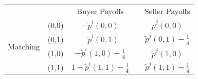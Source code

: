 \documentclass[12pt,letterpaper]{article}           %
\begin{document}
\newpage

\begin{table}[]
	\begin{tabular}{lcccc}
		&                            & Buyer Payoffs         &                       & Seller Payoffs        \\ \cline{3-3} \cline{5-5} 
		& \multicolumn{1}{c|}{(0,0)} & \multicolumn{1}{c|}{$ -\tilde{p}^i(0,0)$} & \multicolumn{1}{c|}{} & \multicolumn{1}{c|}{$ \tilde{p}^j(0,0)$} \\ \cline{3-3} \cline{5-5} 
		\multirow{2}{*}{Matching} & \multicolumn{1}{c|}{(0,1)} & \multicolumn{1}{c|}{$ -\tilde{p}^i(0,1)$} & \multicolumn{1}{c|}{} & \multicolumn{1}{c|}{$ \tilde{p}^j(0,1) -\frac{1}{4}$}  \\ \cline{3-3} \cline{5-5} 
		& \multicolumn{1}{c|}{(1,0)} & \multicolumn{1}{c|}{$ -\tilde{p}^i(1,0) - \frac{1}{4}$} & \multicolumn{1}{c|}{} & \multicolumn{1}{c|}{$ \tilde{p}^j(1,0)$} \\ \cline{3-3} \cline{5-5} 
		& \multicolumn{1}{c|}{(1,1)} & \multicolumn{1}{c|}{$ 1- \tilde{p}^i(1,1) - \frac{1}{4}$} & \multicolumn{1}{c|}{} & \multicolumn{1}{c|}{$ \tilde{p}^j(1,1)- \frac{1}{4}$} \\ \cline{3-3} \cline{5-5} 
	\end{tabular}
\end{table}
\end{document}
